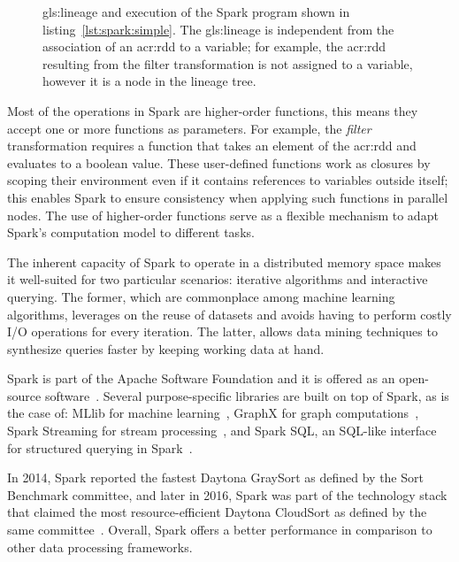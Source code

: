 \begin{figure}[t]
\caption[\Gls{gls:lineage} tree and execution of a Spark program]{\Gls{gls:lineage} and execution of the Spark program shown in listing~\ref{lst:spark:simple}. The \gls{gls:lineage} is independent from the association of an \acrshort{acr:rdd} to a variable; for example, the \acrshort{acr:rdd} resulting from the filter transformation is not assigned to a variable, however it is a node in the lineage tree.}
\end{figure}

Most of the operations in Spark are higher-order functions, this means they accept one or more functions as parameters. For example, the \textit{filter} transformation requires a function that takes an element of the \acrshort{acr:rdd} and evaluates to a boolean value. These user-defined functions work as closures by scoping their environment even if it contains references to variables outside itself; this enables Spark to ensure consistency when applying such functions in parallel nodes. The use of higher-order functions serve as a flexible mechanism to adapt Spark's computation model to different tasks.

The inherent capacity of Spark to operate in a distributed memory space makes it well-suited for two particular scenarios: iterative algorithms and interactive querying. The former, which are commonplace among machine learning algorithms, leverages on the reuse of datasets and avoids having to perform costly I/O operations for every iteration. The latter, allows data mining techniques to synthesize queries faster by keeping working data at hand.

Spark is part of the Apache Software Foundation and it is offered as an open-source software~\cite{WebApache2017,WebSpark2017}. Several purpose-specific libraries are built on top of Spark, as is the case of: MLlib for machine learning~\cite{Meng2016}, GraphX for graph computations~\cite{Xin2013}, Spark Streaming for stream processing~\cite{Zahariaa}, and Spark SQL, an \mbox{SQL-like} interface for structured querying in Spark~\cite{Armbrust2015a}.

In 2014, Spark reported the fastest Daytona GraySort as defined by the Sort Benchmark committee, and later in 2016, Spark was part of the technology stack that claimed the most resource-efficient Daytona CloudSort as defined by the same committee~\cite{WebSortBenchmark2017,Xin2014,Wang}. Overall, Spark offers a better performance in comparison to other data processing frameworks.

